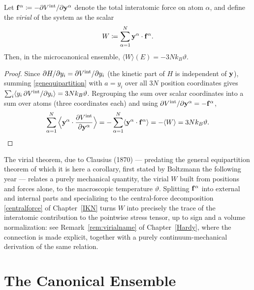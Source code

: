 \begin{corollary}\label{cor:virial}
	Let $\mathbf{f}^\alpha\coloneqq-\partial V^{\rm int}/\partial\mathbf{y}^\alpha$ denote the total interatomic force on atom $\alpha$, and define the \textit{virial} of the system as the scalar
	\begin{equation}\label{virialdef}
		W \coloneqq \sum_{\alpha=1}^N \mathbf{y}^\alpha\cdot\mathbf{f}^\alpha.
	\end{equation}
	Then, in the microcanonical ensemble, $\langle W\rangle(E) = -3Nk_B\vartheta$.
\end{corollary}

\begin{proof}
	Since $\partial H/\partial y_i=\partial V^{\rm int}/\partial y_i$ (the kinetic part of $H$ is independent of $\mathbf{y}$), summing \eqref{genequipartition} with $a=y_i$ over all $3N$ position coordinates gives $\sum_i\langle y_i\,\partial V^{\rm int}/\partial y_i\rangle=3Nk_B\vartheta$. Regrouping the sum over scalar coordinates into a sum over atoms (three coordinates each) and using $\partial V^{\rm int}/\partial\mathbf{y}^\alpha=-\mathbf{f}^\alpha$,
	\begin{equation}
		\sum_{\alpha=1}^N\Big\langle\mathbf{y}^\alpha\cdot\frac{\partial V^{\rm int}}{\partial\mathbf{y}^\alpha}\Big\rangle = -\sum_{\alpha=1}^N\langle\mathbf{y}^\alpha\cdot\mathbf{f}^\alpha\rangle = -\langle W\rangle = 3Nk_B\vartheta. \qedhere
	\end{equation}
\end{proof}

\begin{remark}
	The virial theorem, due to Clausius (1870) --- predating the general equipartition theorem of which it is here a corollary, first stated by Boltzmann the following year --- relates a purely mechanical quantity, the virial $W$ built from positions and forces alone, to the macroscopic temperature $\vartheta$. Splitting $\mathbf{f}^\alpha$ into external and internal parts and specializing to the central-force decomposition \eqref{centralforce} of Chapter~\ref{IKN} turns $W$ into precisely the trace of the interatomic contribution to the pointwise stress tensor, up to sign and a volume normalization: see Remark~\ref{rem:virialname} of Chapter~\ref{Hardy}, where the connection is made explicit, together with a purely continuum-mechanical derivation of the same relation.
\end{remark}

\section{The Canonical Ensemble}


